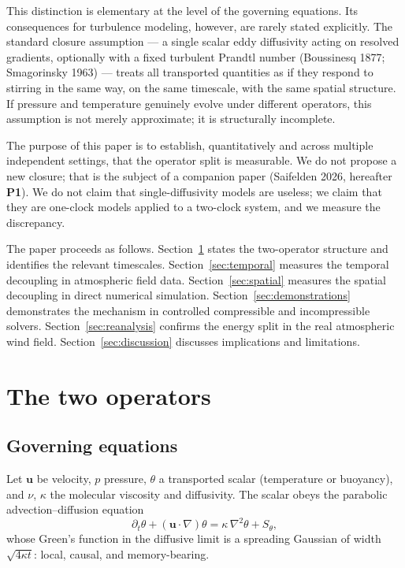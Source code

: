 \documentclass[11pt]{article}
\begin{document}
This distinction is elementary at the level of the governing equations. Its
consequences for turbulence modeling, however, are rarely stated explicitly. The
standard closure assumption --- a single scalar eddy diffusivity acting on
resolved gradients, optionally with a fixed turbulent Prandtl number (Boussinesq
1877; Smagorinsky 1963) --- treats all transported quantities as if they respond
to stirring in the same way, on the same timescale, with the same spatial
structure. If pressure and temperature genuinely evolve under different operators,
this assumption is not merely approximate; it is structurally incomplete.

The purpose of this paper is to establish, quantitatively and across multiple
independent settings, that the operator split is measurable. We do not propose a
new closure; that is the subject of a companion paper (Saifelden 2026, hereafter
\textbf{P1}). We do not claim that single-diffusivity models are useless; we claim
that they are one-clock models applied to a two-clock system, and we measure the
discrepancy.

The paper proceeds as follows. Section~\ref{sec:operators} states the two-operator
structure and identifies the relevant timescales. Section~\ref{sec:temporal}
measures the temporal decoupling in atmospheric field data.
Section~\ref{sec:spatial} measures the spatial decoupling in direct numerical
simulation. Section~\ref{sec:demonstrations} demonstrates the mechanism in
controlled compressible and incompressible solvers. Section~\ref{sec:reanalysis}
confirms the energy split in the real atmospheric wind field.
Section~\ref{sec:discussion} discusses implications and limitations.

\section{The two operators}
\label{sec:operators}

\subsection{Governing equations}

Let $\mathbf{u}$ be velocity, $p$ pressure, $\theta$ a transported scalar
(temperature or buoyancy), and $\nu$, $\kappa$ the molecular viscosity and
diffusivity. The scalar obeys the parabolic advection--diffusion equation
\begin{equation}
\partial_t \theta + (\mathbf{u}\cdot\nabla)\theta
= \kappa\,\nabla^2\theta + S_\theta,
\label{eq:scalar}
\end{equation}
whose Green's function in the diffusive limit is a spreading Gaussian of width
$\sqrt{4\kappa t}$: local, causal, and memory-bearing.
\end{document}
